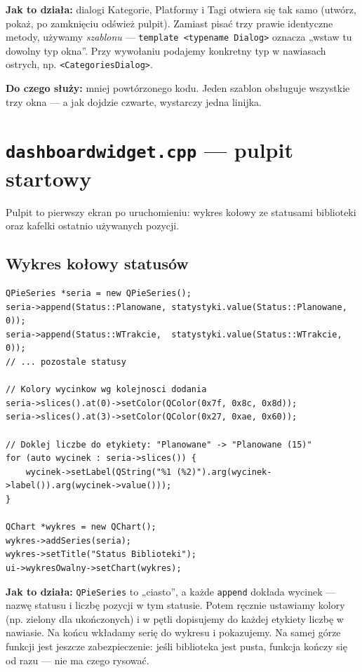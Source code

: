 \documentclass[11pt,a4paper]{article}
\begin{document}
\textbf{Jak to działa:} dialogi Kategorie, Platformy i Tagi otwiera się tak samo
(utwórz, pokaż, po zamknięciu odśwież pulpit). Zamiast pisać trzy prawie
identyczne metody, używamy \emph{szablonu} --- \texttt{template <typename Dialog>}
oznacza „wstaw tu dowolny typ okna”. Przy wywołaniu podajemy konkretny typ
w nawiasach ostrych, np. \texttt{<CategoriesDialog>}.

\textbf{Do czego służy:} mniej powtórzonego kodu. Jeden szablon obsługuje wszystkie
trzy okna --- a jak dojdzie czwarte, wystarczy jedna linijka.

\section{\texttt{dashboardwidget.cpp} --- pulpit startowy}

Pulpit to pierwszy ekran po uruchomieniu: wykres kołowy ze statusami biblioteki
oraz kafelki ostatnio używanych pozycji.

\subsection{Wykres kołowy statusów}

\begin{lstlisting}[caption={Budowa wykresu kołowego}]
QPieSeries *seria = new QPieSeries();
seria->append(Status::Planowane, statystyki.value(Status::Planowane, 0));
seria->append(Status::WTrakcie,  statystyki.value(Status::WTrakcie, 0));
// ... pozostale statusy

// Kolory wycinkow wg kolejnosci dodania
seria->slices().at(0)->setColor(QColor(0x7f, 0x8c, 0x8d));
seria->slices().at(3)->setColor(QColor(0x27, 0xae, 0x60));

// Doklej liczbe do etykiety: "Planowane" -> "Planowane (15)"
for (auto wycinek : seria->slices()) {
    wycinek->setLabel(QString("%1 (%2)").arg(wycinek->label()).arg(wycinek->value()));
}

QChart *wykres = new QChart();
wykres->addSeries(seria);
wykres->setTitle("Status Biblioteki");
ui->wykresOwalny->setChart(wykres);
\end{lstlisting}

\textbf{Jak to działa:} \texttt{QPieSeries} to „ciasto”, a każde \texttt{append} dokłada
wycinek --- nazwę statusu i liczbę pozycji w tym statusie. Potem ręcznie ustawiamy
kolory (np. zielony dla ukończonych) i w pętli dopisujemy do każdej etykiety
liczbę w nawiasie. Na końcu wkładamy serię do wykresu i pokazujemy.
Na samej górze funkcji jest jeszcze zabezpieczenie: jeśli biblioteka jest pusta,
funkcja kończy się od razu --- nie ma czego rysować.
\end{document}
